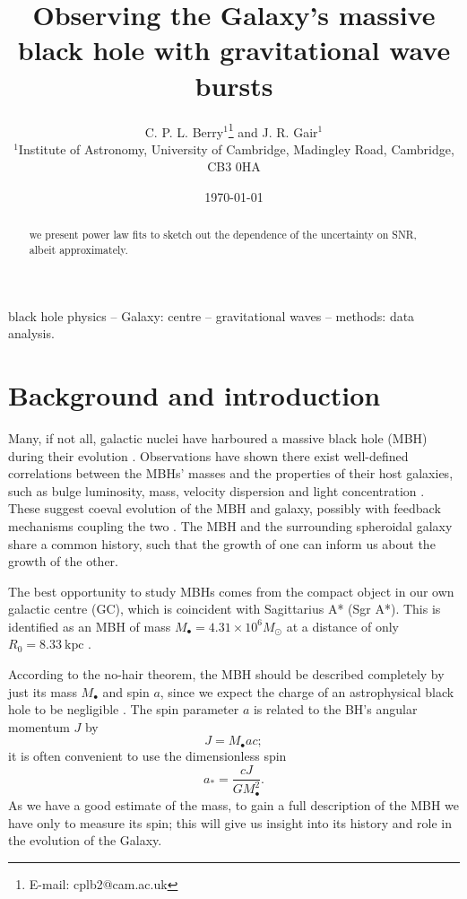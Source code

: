 \documentclass[useAMS,usedcolumn,usegraphicx,usenatbib]{mn2e}
\title[Observing the Galaxy's MBH with GW bursts]{Observing the Galaxy's massive black hole with gravitational wave bursts}
\author[C. P. L. Berry and J. R. Gair]{C. P. L. Berry$^{1}$\thanks{E-mail:
cplb2@cam.ac.uk}  and J. R. Gair$^{1}$\\
$^{1}$Institute of Astronomy, University of Cambridge, Madingley Road, Cambridge, CB3 0HA}
\newcommand{\units}[1]{\ensuremath{~\mathrm{#1}}}
\begin{document}
\date{\today}

\pagerange{\pageref{firstpage}--\pageref{lastpage}} 

\maketitle

\label{firstpage}

\begin{abstract}
we present power law fits to sketch out the dependence of the uncertainty on SNR, albeit approximately.
\end{abstract}

\begin{keywords}
black hole physics -- Galaxy: centre -- gravitational waves -- methods: data analysis.
\end{keywords}

\section{Background and introduction}\label{sec:Intro}

Many, if not all, galactic nuclei have harboured a massive black hole (MBH) during their evolution \citep{Lynden-Bell1971, Soltan1982, Rees1984}. Observations have shown there exist well-defined correlations between the MBHs' masses and the properties of their host galaxies, such as bulge luminosity, mass, velocity dispersion and light concentration \citep{Kormendy1995, Magorrian1998, Ferrarese2000, Gebhardt2000, Graham2001, Tremaine2002, Marconi2003, Haring2004, Graham2007, Graham2011}. These suggest coeval evolution of the MBH and galaxy, possibly with feedback mechanisms coupling the two \citep{Haiman2004, Volonteri2009}. The MBH and the surrounding spheroidal galaxy share a common history, such that the growth of one can inform us about the growth of the other.

The best opportunity to study MBHs comes from the compact object in our own galactic centre (GC), which is coincident with Sagittarius A* (Sgr A*). This is identified as an MBH of mass $M_\bullet = 4.31 \times 10^6 M_\odot$ at a distance of only $R_0 = 8.33\units{kpc}$ \citep{Gillessen2009}.

According to the no-hair theorem, the MBH should be described completely by just its mass $M_\bullet$ and spin $a$, since we expect the charge of an astrophysical black hole to be negligible \citep{Israel1967, Israel1968, Carter1971, Hawking1972, Robinson1975, Chandrasekhar1998}. The spin parameter $a$ is related to the BH's angular momentum $J$ by
\begin{equation}
J = M_\bullet ac;
\end{equation}
it is often convenient to use the dimensionless spin
\begin{equation}
a_\ast = \frac{cJ}{GM_\bullet^2}.
\end{equation}
As we have a good estimate of the mass, to gain a full description of the MBH we have only to measure its spin; this will give us insight into its history and role in the evolution of the Galaxy.
\end{document}
